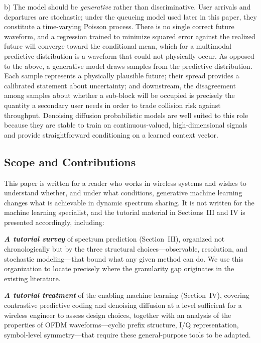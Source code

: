 \documentclass[lettersize,journal]{IEEEtran}
\begin{document}
b) The model should be \emph{generative} rather than discriminative.
User arrivals and departures are stochastic;
under the queueing model used later in this paper, they constitute a
time-varying Poisson process.
There is no single correct future
waveform, and a regression trained to minimize squared error against the
realized future will converge toward the conditional mean, which for a
multimodal predictive distribution is a waveform that could not
physically occur.
As opposed to the above, a generative model draws samples from the
predictive distribution.
Each sample represents a physically plausible future;
their spread provides a calibrated statement about uncertainty; and
downstream, the disagreement among samples about whether a sub-block
will be occupied is precisely the quantity a secondary user needs in
order to trade collision risk against throughput.
Denoising diffusion probabilistic models \cite{Ho2020, SohlDickstein2015, Song2021}
are well suited to this role because they are stable to train on
continuous-valued, high-dimensional signals and provide straightforward
conditioning on a learned context vector.

\subsection{\textbf{Scope and Contributions}}
This paper is written for a reader who works in wireless systems and
wishes to understand whether, and under what conditions, generative
machine learning changes what is achievable in dynamic spectrum sharing.
It is not written for the machine learning specialist, and the tutorial
material in Sections~III and IV is presented accordingly, including:

\textbf{\emph{A tutorial survey}} of spectrum prediction
(Section~III), organized not chronologically but by the three
structural choices---observable, resolution, and stochastic
modeling---that bound what any given method can do. We use this
organization to locate precisely where the granularity gap originates
in the existing literature.

\textbf{\emph{A tutorial treatment}} of the enabling machine learning
(Section~IV), covering contrastive predictive coding and denoising
diffusion at a level sufficient for a wireless engineer to assess
design choices, together with an analysis of the properties of OFDM
waveforms---cyclic prefix structure, I/Q representation, symbol-level
symmetry---that require these general-purpose tools to be adapted.
\end{document}
